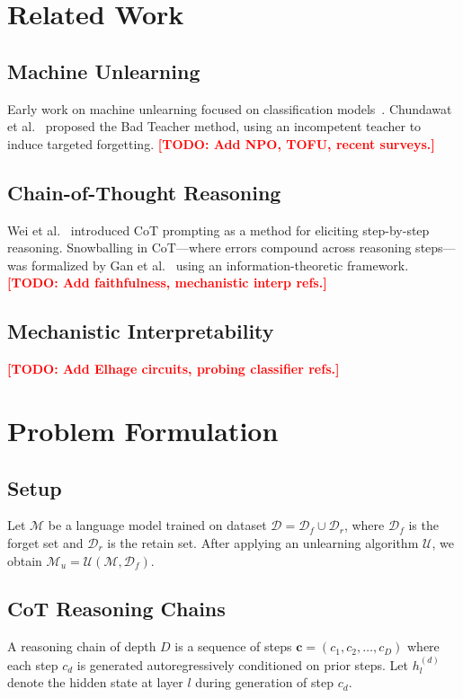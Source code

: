 \documentclass[letterpaper]{article}
\newcommand{\forget}{\mathcal{D}_f}
\newcommand{\retain}{\mathcal{D}_r}
\newcommand{\TODO}[1]{\textcolor{red}{\textbf{[TODO: #1]}}}
\begin{document}
\section{Related Work}
\label{sec:related}

\subsection{Machine Unlearning}
Early work on machine unlearning focused on classification
models~\cite{thudi2022unrolling}. Chundawat et al.~\cite{chundawat2023bad}
proposed the Bad Teacher method, using an incompetent teacher to induce
targeted forgetting. \TODO{Add NPO, TOFU, recent surveys.}

\subsection{Chain-of-Thought Reasoning}
Wei et al.~\cite{wei2022chain} introduced CoT prompting as a method for
eliciting step-by-step reasoning. Snowballing in CoT---where errors compound
across reasoning steps---was formalized by Gan et al.~\cite{gan2025snowball}
using an information-theoretic framework. \TODO{Add faithfulness, mechanistic interp refs.}

\subsection{Mechanistic Interpretability}
\TODO{Add Elhage circuits, probing classifier refs.}

\section{Problem Formulation}
\label{sec:formulation}

\subsection{Setup}
Let $\mathcal{M}$ be a language model trained on dataset $\mathcal{D} = \forget \cup \retain$,
where $\forget$ is the forget set and $\retain$ is the retain set.
After applying an unlearning algorithm $\mathcal{U}$, we obtain $\mathcal{M}_u = \mathcal{U}(\mathcal{M}, \forget)$.

\subsection{CoT Reasoning Chains}
A reasoning chain of depth $D$ is a sequence of steps
$\mathbf{c} = (c_1, c_2, \ldots, c_D)$ where each step $c_d$ is generated
autoregressively conditioned on prior steps. Let $h_l^{(d)}$ denote the
hidden state at layer $l$ during generation of step $c_d$.
\end{document}
